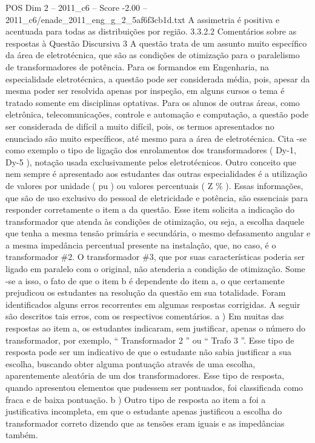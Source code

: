 \begin{textsample}{POS Dim 2 – 2011\_c6 – Score -2.00 – 2011\_c6/enade\_2011\_eng\_g\_2\_5af6f3cb1d.txt}
A assimetria é positiva e acentuada para todas as distribuições por região. 3.3.2.2 Comentários sobre as respostas à Questão Discursiva 3 A questão trata de um assunto muito específico da área de eletrotécnica, que são as condições de otimização para o paralelismo de transformadores de potência.
Para os formandos em Engenharia, na especialidade eletrotécnica, a questão pode ser considerada média, pois, apesar da mesma poder ser resolvida apenas por inspeção, em alguns cursos o tema é tratado somente em disciplinas optativas.
Para os alunos de outras áreas, como eletrônica, telecomunicações, controle e automação e computação, a questão pode ser considerada de difícil a muito difícil, pois, os termos apresentados no enunciado são muito específicos, até mesmo para a área de eletrotécnica.
Cita -se como exemplo o tipo de ligação dos enrolamentos dos transformadores ( Dy-1, Dy-5 ), notação usada exclusivamente pelos eletrotécnicos.
Outro conceito que nem sempre é apresentado aos estudantes das outras especialidades é a utilização de valores por unidade ( pu ) ou valores percentuais ( Z \% ).
Essas informações, que são de uso exclusivo do pessoal de eletricidade e potência, são essenciais para responder corretamente o item a da questão.
Esse item solicita a indicação do transformador que atenda às condições de otimização, ou seja, a escolha daquele que tenha a mesma tensão primária e secundária, o mesmo defasamento angular e a mesma impedância percentual presente na instalação, que, no caso, é o transformador \#2.
O transformador \#3, que por suas características poderia ser ligado em paralelo com o original, não atenderia a condição de otimização.
Some -se a isso, o fato de que o item b é dependente do item a, o que certamente prejudicou os estudantes na resolução da questão em sua totalidade.
Foram identificados alguns erros recorrentes em algumas respostas corrigidas.
A seguir são descritos tais erros, com os respectivos comentários. a ) Em muitas das respostas ao item a, os estudantes indicaram, sem justificar, apenas o número do transformador, por exemplo, “ Transformador 2 ” ou “ Trafo 3 ”.
Esse tipo de resposta pode ser um indicativo de que o estudante não sabia justificar a sua escolha, buscando obter alguma pontuação através de uma escolha, aparentemente aleatória de um dos transformadores.
Esse tipo de resposta, quando apresentou elementos que pudessem ser pontuados, foi classificada como fraca e de baixa pontuação. b ) Outro tipo de resposta ao item a foi a justificativa incompleta, em que o estudante apenas justificou a escolha do transformador correto dizendo que as tensões eram iguais e as impedâncias também.

\end{textsample}

